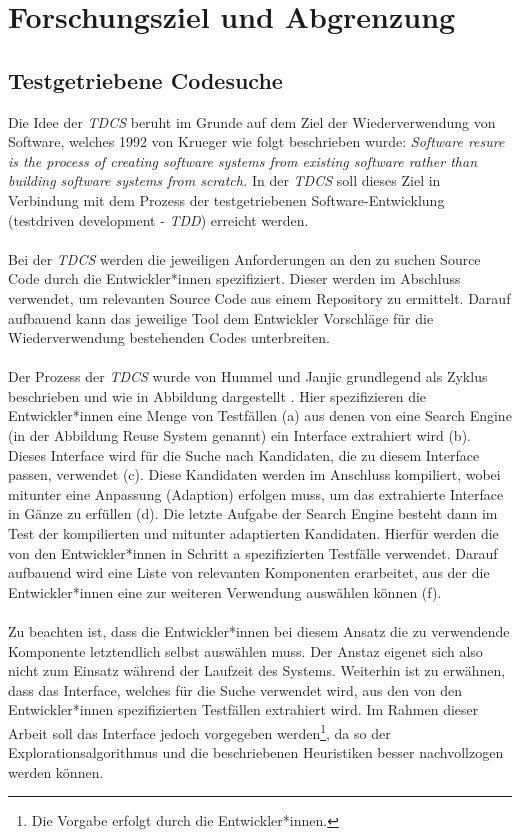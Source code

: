 \chapter{Forschungsziel und Abgrenzung}\label{chap_problem}
\section{Testgetriebene Codesuche}
Die Idee der \emph{TDCS} beruht im Grunde auf dem Ziel der Wiederverwendung von Software, welches 1992 von Krueger wie folgt beschrieben wurde:
\emph{\glqq Software resure is the process of creating software systems from existing software rather than building software systems from scratch.\grqq{}} \cite{krueger} In der \emph{TDCS} soll dieses Ziel in Verbindung mit dem Prozess der testgetriebenen Software-Entwicklung (testdriven development - \emph{TDD}) erreicht werden. \cite{hummel08} 
\\\\
Bei der \emph{TDCS} werden die jeweiligen Anforderungen an den zu suchen Source Code durch die Entwickler*innen spezifiziert. Dieser werden im Abschluss verwendet, um relevanten Source Code aus einem Repository zu ermittelt. Darauf aufbauend kann das jeweilige Tool dem Entwickler Vorschläge für die Wiederverwendung bestehenden Codes unterbreiten.
\\\\
Der Prozess der \emph{TDCS} wurde von Hummel und Janjic grundlegend als Zyklus beschrieben und wie in Abbildung  dargestellt  \cite{Hummel2013}.
\noindent
Hier spezifizieren die Entwickler*innen eine Menge von Testfällen (a) aus denen von eine Search Engine (in der Abbildung \glqq Reuse System\grqq{} genannt) ein Interface extrahiert wird (b). Dieses Interface wird für die Suche nach Kandidaten, die zu diesem Interface passen, verwendet (c). Diese Kandidaten werden im Anschluss kompiliert, wobei mitunter eine Anpassung (Adaption) erfolgen muss, um das extrahierte Interface in Gänze zu erfüllen (d). Die letzte Aufgabe der Search Engine besteht dann im Test der kompilierten und mitunter adaptierten Kandidaten. Hierfür werden die von den Entwickler*innen in Schritt a spezifizierten Testfälle verwendet. Darauf aufbauend wird eine Liste von relevanten Komponenten erarbeitet, aus der die Entwickler*innen eine zur weiteren Verwendung auswählen können (f).
\\\\
Zu beachten ist, dass die Entwickler*innen bei diesem Ansatz die zu verwendende Komponente letztendlich selbst auswählen muss. Der Anstaz eigenet sich also nicht zum Einsatz während der Laufzeit des Systems. Weiterhin ist zu erwähnen, dass das Interface, welches für die Suche verwendet wird, aus den von den Entwickler*innen spezifizierten Testfällen extrahiert wird. Im Rahmen dieser Arbeit soll das Interface jedoch vorgegeben werden\footnote{Die Vorgabe erfolgt durch die Entwickler*innen.}, da so der Explorationsalgorithmus und die beschriebenen Heuristiken besser nachvollzogen werden können.
